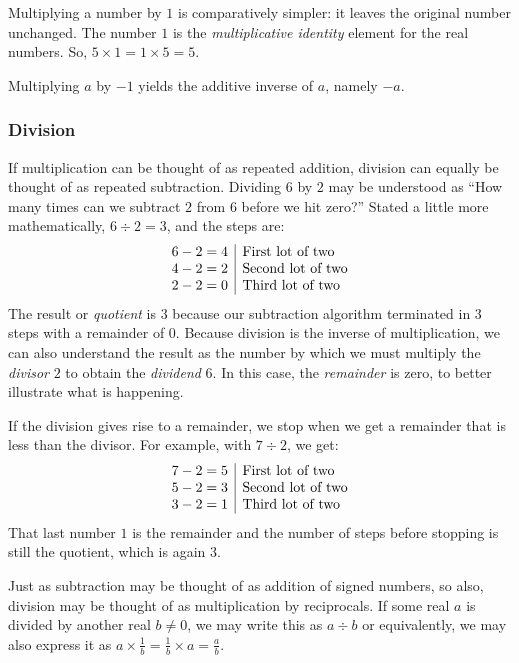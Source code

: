 \documentclass[
  a4paper,
]{article}
\begin{document}
Multiplying a number by \(1\) is comparatively simpler: it leaves the
original number unchanged. The number \(1\) is the \emph{multiplicative
identity} element for the real numbers. So,
\(5 \times 1 = 1 \times 5 = 5\).

Multiplying \(a\) by \(-1\) yields the additive inverse of \(a\), namely
\(-a\).

\hypertarget{division}{%
\subsubsection{Division}\label{division}}

If multiplication can be thought of as repeated addition, division can
equally be thought of as repeated subtraction. Dividing \(6\) by \(2\)
may be understood as ``How many times can we subtract \(2\) from \(6\)
before we hit zero?'' Stated a little more mathematically,
\(6 \div 2 = 3\), and the steps are: \[
\begin{array}{r | l}
6 - 2 = 4 & \mbox{First lot of two}\\
4 - 2 = 2 & \mbox{Second lot of two}\\
2 - 2 = 0 & \mbox{Third lot of two}\\
\end{array}
\] The result or \emph{quotient} is \(3\) because our subtraction
algorithm terminated in \(3\) steps with a remainder of \(0\). Because
division is the inverse of multiplication, we can also understand the
result as the number by which we must multiply the \emph{divisor} \(2\)
to obtain the \emph{dividend} \(6\). In this case, the \emph{remainder}
is zero, to better illustrate what is happening.

If the division gives rise to a remainder, we stop when we get a
remainder that is less than the divisor. For example, with \(7 \div 2\),
we get: \[
\begin{array}{r | l}
7 - 2 = 5 & \mbox{First lot of two}\\
5 - 2 = 3 & \mbox{Second lot of two}\\
3 - 2 = 1 & \mbox{Third lot of two}\\
\end{array}
\] That last number \(1\) is the remainder and the number of steps
before stopping is still the quotient, which is again \(3\).

Just as subtraction may be thought of as addition of signed numbers, so
also, division may be thought of as multiplication by reciprocals. If
some real \(a\) is divided by another real \(b \ne 0\), we may write
this as \(a \div b\) or equivalently, we may also express it as
\(a \times \frac{1}{b} = \frac{1}{b} \times a = \frac{a}{b}\).
\end{document}
